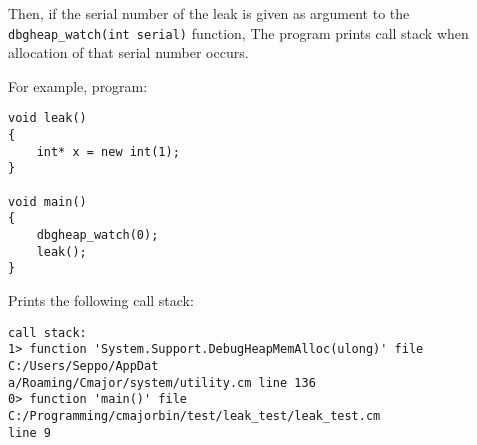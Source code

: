 \documentclass[oneside, a4paper, 11pt]{article}
\begin{document}
Then, if the serial number of the leak is given as argument to the \verb|dbgheap_watch(int serial)| function,
The program prints call stack when allocation of that serial number occurs.

For example, program:

\begin{verbatim}
void leak()
{
    int* x = new int(1);
}

void main()
{
    dbgheap_watch(0);
    leak();
}
\end{verbatim}

Prints the following call stack:

\begin{verbatim}
call stack:
1> function 'System.Support.DebugHeapMemAlloc(ulong)' file C:/Users/Seppo/AppDat
a/Roaming/Cmajor/system/utility.cm line 136
0> function 'main()' file C:/Programming/cmajorbin/test/leak_test/leak_test.cm
line 9
\end{verbatim}
\end{document}
